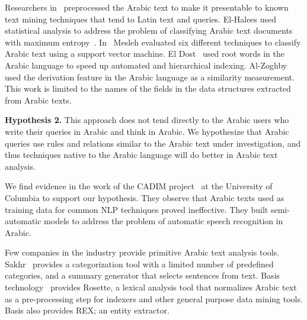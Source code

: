 \documentclass[12pt]{article}
\newcommand{\noTrRL}[1]{\transfalse\RL{#1}\transtrue}
\begin{document}
Researchers in~\cite{AEL07,Ham07,Abd07,MEl03} 
preprocessed the Arabic text to make it presentable to known text 
mining techniques that tend to Latin text and queries.
El-Halees used statistical analysis to address the problem of 
classifying Arabic text documents with maximum 
entropy~\cite{AEL07}.
In~\cite{Abd07} Mesleh evaluated six different techniques to 
classify Arabic text using a support vector machine.
El Dost~\cite{MEl03} used root words in the Arabic language to 
speed up automated and hierarchical indexing.
Al-Zoghby~\cite{Ham07}
used the derivation feature in 
the Arabic language as a similarity measurement.
This work is limited to the names of the fields in the data 
structures extracted from Arabic texts.

{\bf Hypothesis 2.} This approach does not tend directly to 
the Arabic users who write their 
queries in Arabic and think in Arabic.
We hypothesize that Arabic queries use rules and 
relations similar to the Arabic text under investigation, 
and thus techniques native to the Arabic language will do better 
in Arabic text analysis.

We find evidence in the work of the CADIM \noTrRL{q-adim} 
project~\cite{Col09} at the University of Columbia to support our 
hypothesis. They observe that Arabic texts used as training 
data for common NLP techniques proved ineffective. 
They built semi-automatic models to address the problem of automatic 
speech recognition in Arabic.


Few companies in the industry provide primitive Arabic text 
analysis tools.
Sakhr~\cite{Sak09} provides a categorization 
tool with a limited number of predefined categories, and a summary 
generator that selects sentences from text.
Basis technology~\cite{Bas09} provides Rosette, a lexical 
analysis tool that normalizes Arabic text as a pre-processing step 
for indexers and other general purpose data mining 
tools.  Basis also provides REX; an entity extractor.
\end{document}
